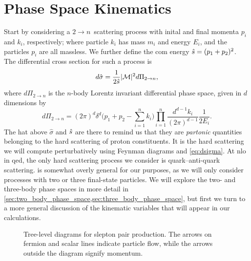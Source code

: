 \section{Phase Space Kinematics}\label{sec:phase_space}
Start by considering a $2 \to n$~scattering process with inital and final momenta $p_i$ and $k_i$, respectively; where particle $k_i$ has mass $m_i$ and energy $E_i$, and the particles $p_i$ are all massless. We further define the \gls{com} energy $\hat{s} = (p_1+p_2)^2$.
The differential cross section for such a process is~\cite{ParticleDataGroup:2026aaa}
\begin{equation}
    d\hat{\sigma} = \frac{1}{2\hat{s}} \lvert\mathcal{M}\rvert^2 d\Pi_{2 \to n},
    \label{eq:dsigma}
\end{equation}
where $d\Pi_{2 \to n}$ is the $n$-body Lorentz invariant differential phase space, given in $d$ dimensions by
\begin{equation}
    d\Pi_{2 \to n} = (2\pi)^d\delta^d \biggl( p_1+p_2 - \sum_{i=1}^n k_i \biggr) \prod_{i=1}^n \frac{d^{d-1}k_i}{(2\pi)^{d-1}}\frac{1}{2E_i}.
    \label{eq:dPi_n}
\end{equation}
The hat above $\hat\sigma$ and $\hat{s}$ are there to remind us that they are \textit{partonic} quantities belonging to the hard scattering of proton constituents. It is the hard scattering we will compute perturbatively using Feynman diagrams and \cref{eq:dsigma}. At \gls{nlo} in \gls{qed}, the only hard scattering process we consider is quark--anti-quark scattering.
 is somewhat overly general for our purposes, as we will only consider processes with two or three final-state particles. We will explore the two- and three-body phase spaces in more detail in \cref{sec:two_body_phase_space,sec:three_body_phase_space}, but first we turn to a more general discussion of the kinematic variables that will appear in our calculations.

\begin{figure}
    \centering
    \caption{Tree-level diagrams for slepton pair production. The arrows on fermion and scalar lines indicate particle flow, while the arrows outside the diagram signify momentum.}
    \label{fig:M_lo}
\end{figure}

